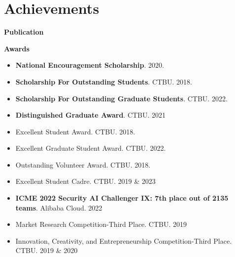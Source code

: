 \documentclass[a4paper,20pt]{article}
\begin{document}
\section{Achievements}
\textbf{Publication}
\nocite{*}

\textbf{Awards}

    \begin{itemize}
    \centering
    \justifying
 \item {\textbf{National Encouragement Scholarship}. 2020.}
\vspace{-5pt}	
   \item{\textbf{Scholarship For Outstanding Students}. CTBU. 2018.}
    \vspace{-5pt}
       \item{\textbf{Scholarship For Outstanding Graduate Students}. CTBU. 2022.}
    \vspace{-5pt}
    \item{\textbf{Distinguished Graduate Award}. CTBU. 2021}
        \vspace{-5pt}
        \item{Excellent Student Award. CTBU. 2018.}
    \vspace{-5pt}
    \item{Excellent Graduate Student Award. CTBU. 2022.}
    \vspace{-5pt}
    \item {Outstanding Volunteer Award. CTBU. 2018.}
    \vspace{-5pt}
    \item {Excellent Student Cadre. CTBU. 2019 \& 2023}
    \vspace{-5pt}
    \item {\textbf{ICME 2022 Security AI Challenger IX: 7th place out of 2135 teams}. Alibaba Cloud. 2022}
    \vspace{-5pt}
    \item {Market Research Competition-Third Place. CTBU. 2019}
    \vspace{-5pt}
    \item {Innovation, Creativity, and Entrepreneurship Competition-Third Place. CTBU. 2019 \& 2020}

    
\end{itemize}
	
\end{document}
